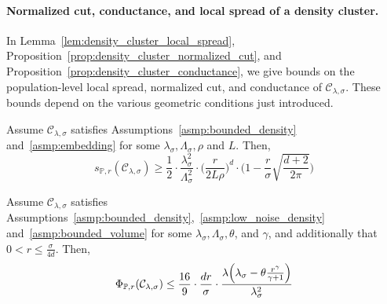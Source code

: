 \documentclass[11pt,twoside]{article}
\newcommand{\1}{\mathbf{1}}
\newcommand{\mc}[1]{\mathcal{#1}}
\newcommand{\Pbb}{\mathbb{P}}
\begin{document}
\paragraph{Normalized cut, conductance, and local spread of a density cluster.} In Lemma~\ref{lem:density_cluster_local_spread}, Proposition~\ref{prop:density_cluster_normalized_cut}, and Proposition~\ref{prop:density_cluster_conductance}, we give bounds on the population-level local spread, normalized cut, and conductance of $\mc{C}_{\lambda,\sigma}$. These bounds depend on the various geometric conditions just introduced. 
\begin{lemma}
	\label{lem:density_cluster_local_spread}
	Assume $\mc{C}_{\lambda,\sigma}$ satisfies Assumptions~\ref{asmp:bounded_density} and~\ref{asmp:embedding} for some $\lambda_{\sigma},\Lambda_{\sigma},\rho$ and $L$. Then,
	\begin{equation}
	\label{eqn:density_cluster_local_spread}
	s_{\Pbb,r}(\mc{C}_{\lambda,\sigma}) \geq \frac{1}{2} \cdot \frac{\lambda_{\sigma}^2}{\Lambda_{\sigma}^2} \cdot \biggl(\frac{r}{2L\rho}\biggr)^{d} \cdot \biggl(1 - \frac{r}{\sigma} \sqrt{\frac{d + 2}{2\pi}}\biggr)
	\end{equation}
\end{lemma}

\begin{proposition}
	\label{prop:density_cluster_normalized_cut}
	Assume $\mc{C}_{\lambda,\sigma}$ satisfies Assumptions~\ref{asmp:bounded_density},~\ref{asmp:low_noise_density} and~\ref{asmp:bounded_volume} for some $\lambda_{\sigma}, \Lambda_{\sigma}, \theta$, and $\gamma$, and additionally that $0 < r \leq \frac{\sigma}{4d}$. Then,
	\begin{equation}
	\label{eqn:density_cluster_normalized_cut}
	\Phi_{\Pbb,r}(\mc{C}_{\lambda,\sigma}) \leq \frac{16}{9} \cdot \frac{dr}{\sigma} \cdot \frac{\lambda\Bigl(\lambda_{\sigma} - \theta \frac{r^{\gamma}}{\gamma + 1}\Bigr)}{\lambda_{\sigma}^2}
	\end{equation}
\end{proposition}
\end{document}
